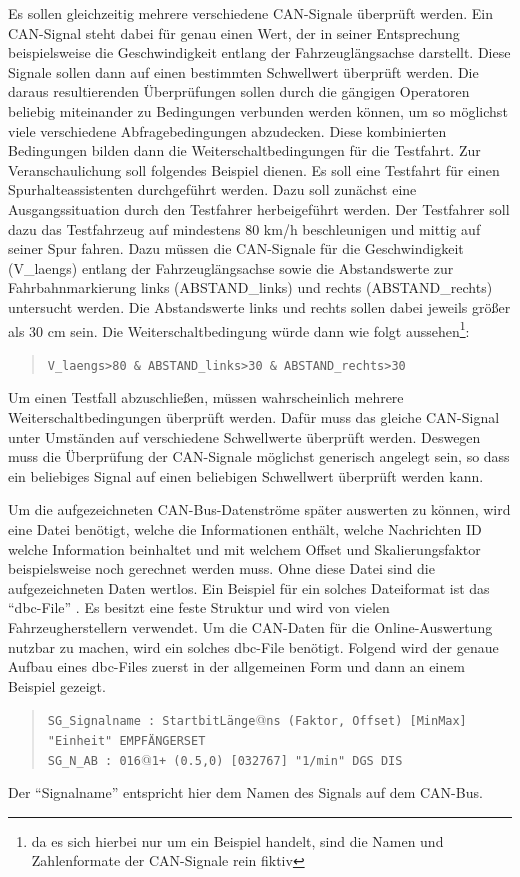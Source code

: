 \documentclass[12pt,a4paper]{report}
\begin{document}
Es sollen gleichzeitig mehrere verschiedene CAN-Signale überprüft werden. Ein CAN-Signal steht dabei für genau einen Wert, der in seiner Entsprechung beispielsweise die Geschwindigkeit entlang der Fahrzeuglängsachse darstellt. Diese Signale sollen dann auf einen bestimmten Schwellwert überprüft werden. Die daraus resultierenden Überprüfungen sollen durch die gängigen Operatoren beliebig miteinander zu Bedingungen verbunden werden können, um so möglichst viele verschiedene Abfragebedingungen abzudecken. Diese kombinierten Bedingungen bilden dann die Weiterschaltbedingungen für die Testfahrt. Zur Veranschaulichung soll folgendes Beispiel dienen. Es soll eine Testfahrt für einen Spurhalteassistenten durchgeführt werden. Dazu soll zunächst eine Ausgangssituation durch den Testfahrer herbeigeführt werden. Der Testfahrer soll dazu das Testfahrzeug auf mindestens 80 km/h beschleunigen und mittig auf seiner Spur fahren. Dazu müssen die CAN-Signale für die Geschwindigkeit (V\_laengs) entlang der Fahrzeuglängsachse sowie die Abstandswerte zur Fahrbahnmarkierung links (ABSTAND\_links) und rechts (ABSTAND\_rechts) untersucht werden. Die Abstandswerte links und rechts sollen dabei jeweils grö\ss er als 30 cm sein. Die Weiterschaltbedingung würde dann wie folgt aussehen\footnote{da es sich hierbei nur um ein Beispiel handelt, sind die Namen und Zahlenformate der CAN-Signale rein fiktiv}:
\begin{quote}
\verb|V_laengs>80 & ABSTAND_links>30 & ABSTAND_rechts>30|
\end{quote}
Um einen Testfall abzuschlie\ss en, müssen wahrscheinlich mehrere Weiterschaltbedingungen überprüft werden. Dafür muss das gleiche CAN-Signal unter Umständen auf verschiedene Schwellwerte überprüft werden. Deswegen muss die Überprüfung der CAN-Signale möglichst generisch angelegt sein, so dass ein beliebiges Signal auf einen beliebigen Schwellwert überprüft werden kann.

Um die aufgezeichneten CAN-Bus-Datenströme später auswerten zu können, wird eine Datei benötigt, welche die Informationen enthält, welche Nachrichten ID welche Information beinhaltet und mit welchem Offset und Skalierungsfaktor beispielsweise noch gerechnet werden muss. Ohne diese Datei sind die aufgezeichneten Daten wertlos. Ein Beispiel für ein solches Dateiformat ist das "`dbc-File"' \cite{VectorDBC}. Es besitzt eine feste Struktur und wird von vielen Fahrzeugherstellern verwendet. Um die CAN-Daten für die Online-Auswertung nutzbar zu machen, wird ein solches dbc-File benötigt. Folgend wird der genaue Aufbau eines dbc-Files zuerst in der allgemeinen Form und dann an einem Beispiel gezeigt\cite{CANFederl}.
\begin{quote}
\verb|SG_Signalname : Startbit|\big \vert\verb|Länge|@\verb|ns (Faktor, Offset) [Min|\big \vert\verb|Max]|\\\verb|"Einheit" EMPFÄNGERSET|\big \vert\
\\[0.3cm]
\verb|SG_N_AB : 0|\big \vert\verb|16|@\verb|1+ (0.5,0) [0|\big \vert\verb|32767] "1/min" DGS DIS|

\end{quote}
Der "`Signalname"' entspricht hier dem Namen des Signals auf dem CAN-Bus.
\end{document}
